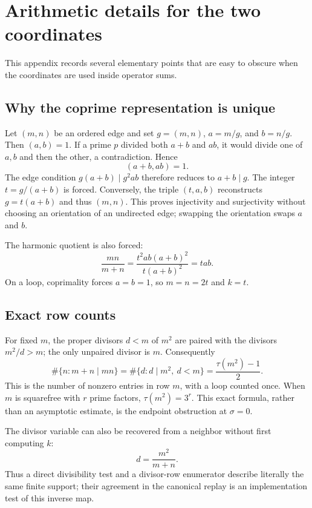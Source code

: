 \section{Arithmetic details for the two coordinates}
\label{app:arithmetic}

This appendix records several elementary points that are easy to obscure
when the coordinates are used inside operator sums.

\subsection{Why the coprime representation is unique}

Let $(m,n)$ be an ordered edge and set $g=(m,n)$, $a=m/g$, and $b=n/g$.
Then $(a,b)=1$.  If a prime $p$ divided both $a+b$ and $ab$, it would divide
one of $a,b$ and then the other, a contradiction.  Hence
\begin{equation}
 (a+b,ab)=1.
 \label{eq:gcd-elementary}
\end{equation}
The edge condition
$g(a+b)\mid g^2ab$ therefore reduces to $a+b\mid g$.  The integer
$t=g/(a+b)$ is forced.  Conversely, the triple $(t,a,b)$ reconstructs
$g=t(a+b)$ and thus $(m,n)$.  This proves injectivity and surjectivity
without choosing an orientation of an undirected edge; swapping the
orientation swaps $a$ and $b$.

The harmonic quotient is also forced:
\[
 \frac{mn}{m+n}
 =\frac{t^2ab(a+b)^2}{t(a+b)^2}=tab.
\]
On a loop, coprimality forces $a=b=1$, so $m=n=2t$ and $k=t$.

\subsection{Exact row counts}

For fixed $m$, the proper divisors $d<m$ of $m^2$ are paired with the
divisors $m^2/d>m$; the only unpaired divisor is $m$.  Consequently
\[
 \#\{n:m+n\mid mn\}
 =\#\{d:d\mid m^2,\ d<m\}
 =\frac{\tau(m^2)-1}{2}.
\]
This is the number of nonzero entries in row $m$, with a loop counted once.
When $m$ is squarefree with $r$ prime factors,
$\tau(m^2)=3^r$.  This exact formula, rather than an asymptotic estimate,
is the endpoint obstruction at $\sigma=0$.

The divisor variable can also be recovered from a neighbor without first
computing $k$:
\[
 d=\frac{m^2}{m+n}.
\]
Thus a direct divisibility test and a divisor-row enumerator describe
literally the same finite support; their agreement in the canonical replay
is an implementation test of this inverse map.

